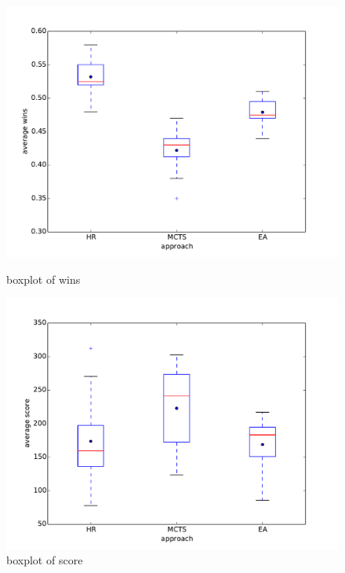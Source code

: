 \begin{figure}
\begin{minipage}{.5\textwidth}
\centering
\includegraphics[scale=0.3]{images/eval_all_wins.pdf}
\caption{boxplot of wins}
\label{fig:eval_all_wins}
\end{minipage}%
\begin{minipage}{.5\textwidth}
\centering
\includegraphics[scale=0.3]{images/eval_all_score.pdf}
\caption{boxplot of score}
\label{fig:eval_all_score}
\end{minipage}
\begin{minipage}{1\textwidth}
\centering

\end{minipage}
\end{figure}
